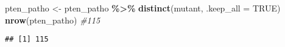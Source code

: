 \documentclass[
]{article}
\newenvironment{Shaded}{\begin{snugshade}}{\end{snugshade}}
\newcommand{\AttributeTok}[1]{\textcolor[rgb]{0.13,0.29,0.53}{#1}}
\newcommand{\CommentTok}[1]{\textcolor[rgb]{0.56,0.35,0.01}{\textit{#1}}}
\newcommand{\ConstantTok}[1]{\textcolor[rgb]{0.56,0.35,0.01}{#1}}
\newcommand{\FunctionTok}[1]{\textcolor[rgb]{0.13,0.29,0.53}{\textbf{#1}}}
\newcommand{\NormalTok}[1]{#1}
\newcommand{\OtherTok}[1]{\textcolor[rgb]{0.56,0.35,0.01}{#1}}
\newcommand{\SpecialCharTok}[1]{\textcolor[rgb]{0.81,0.36,0.00}{\textbf{#1}}}
\newcommand{\StringTok}[1]{\textcolor[rgb]{0.31,0.60,0.02}{#1}}
\begin{document}
\begin{Shaded}
\begin{Highlighting}[]
\NormalTok{pten\_patho }\OtherTok{\textless{}{-}}\NormalTok{ pten\_patho }\SpecialCharTok{\%\textgreater{}\%} \FunctionTok{distinct}\NormalTok{(mutant, }\AttributeTok{.keep\_all =} \ConstantTok{TRUE}\NormalTok{)}
\FunctionTok{nrow}\NormalTok{(pten\_patho) }\CommentTok{\#115}
\end{Highlighting}
\end{Shaded}

\begin{verbatim}
## [1] 115
\end{verbatim}

\begin{Shaded}
\end{Shaded}
\end{document}
